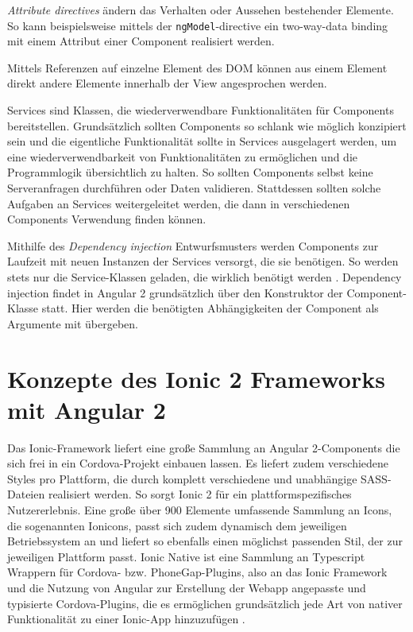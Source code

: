 \emph{Attribute directives} ändern das Verhalten oder Aussehen bestehender Elemente. So kann beispielsweise mittels der \texttt{ngModel}-directive ein two-way-data binding mit einem Attribut einer Component realisiert werden.

Mittels Referenzen auf einzelne Element des DOM können aus einem Element direkt andere Elemente innerhalb der View angesprochen werden.

Services sind Klassen, die wiederverwendbare Funktionalitäten für Components bereitstellen. Grundsätzlich sollten Components so schlank wie möglich konzipiert sein und die eigentliche Funktionalität sollte in Services ausgelagert werden, um eine wiederverwendbarkeit von Funktionalitäten zu ermöglichen und die Programmlogik übersichtlich zu halten. So sollten Components selbst keine Serveranfragen durchführen oder Daten validieren. Stattdessen sollten solche Aufgaben an Services weitergeleitet werden, die dann in verschiedenen Components Verwendung finden können.
%

Mithilfe des \emph{Dependency injection} Entwurfsmusters \cite{angularDependencyInjectionDoku} werden Components zur Laufzeit mit neuen Instanzen der Services versorgt, die sie benötigen. So werden stets nur die Service-Klassen geladen, die wirklich benötigt werden \cite{angularDocuBasicArchitecture}. Dependency injection findet in Angular 2 grundsätzlich über den Konstruktor der Component-Klasse statt. Hier werden die benötigten Abhängigkeiten der Component als Argumente mit übergeben.
%
%
\section{Konzepte des Ionic 2 Frameworks mit Angular 2}
\label{sec:ionicKonzepte}

Das Ionic-Framework liefert eine große Sammlung an Angular 2-Components die sich frei in ein Cordova-Projekt einbauen lassen. Es liefert zudem verschiedene Styles pro Plattform, die durch komplett verschiedene und unabhängige SASS-Dateien realisiert werden. So sorgt Ionic 2 für ein plattformspezifisches Nutzererlebnis. Eine große über 900 Elemente umfassende Sammlung an Icons, die sogenannten Ionicons, passt sich zudem dynamisch dem jeweiligen Betriebssystem an und liefert so ebenfalls einen möglichst passenden Stil, der zur jeweiligen Plattform passt. Ionic Native ist eine Sammlung an Typescript Wrappern für Cordova- bzw. PhoneGap-Plugins, also an das Ionic Framework und die Nutzung von Angular zur Erstellung der Webapp angepasste und typisierte Cordova-Plugins, die es ermöglichen grundsätzlich jede Art von nativer Funktionalität zu einer Ionic-App hinzuzufügen \cite{ionic2Docu}.

